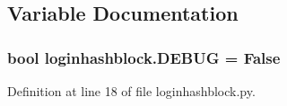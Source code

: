 \subsection{Variable Documentation}
\subsubsection[{\texorpdfstring{D\+E\+B\+UG}{DEBUG}}]{\setlength{\rightskip}{0pt plus 5cm}bool loginhashblock.\+D\+E\+B\+UG = False}\hypertarget{namespaceloginhashblock_ad198a2ffc3d7bab32167aed00d2f5c65}{}\label{namespaceloginhashblock_ad198a2ffc3d7bab32167aed00d2f5c65}


Definition at line 18 of file loginhashblock.\+py.


